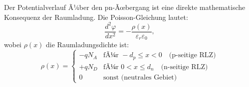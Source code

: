 ﻿\documentclass[12pt, a4paper]{article}
\begin{document}
	Der Potentialverlauf Ã¼ber den pn-Ãœbergang ist eine direkte mathematische
	Konsequenz der Raumladung. Die Poisson-Gleichung lautet:
	\begin{equation}
		\frac{d^2 \varphi}{dx^2} = -\frac{\rho(x)}{\varepsilon_r \varepsilon_0},
	\end{equation}
	wobei $\rho(x)$ die Raumladungsdichte ist:
	\begin{equation}
		\rho(x) = \begin{cases}
			-q N_A & \text{fÃ¼r } -d_p \leq x < 0 \quad \text{(p-seitige RLZ)}\\
			+q N_D & \text{fÃ¼r } 0 < x \leq d_n \quad \text{(n-seitige RLZ)}\\
			0 & \text{sonst (neutrales Gebiet)}
		\end{cases}
	\end{equation}
	
\end{document}
